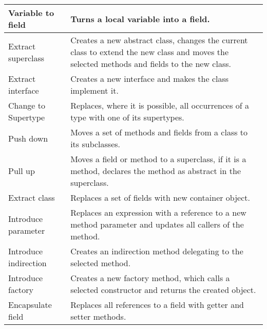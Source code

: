 \begin{table}[htbp]
\begin{tabular}{ |p{2.95cm}| p{9.15cm}|}
Variable to field         & Turns a local variable into a field.                                                                                                                                       \\ \hline
Extract superclass        & Creates a new abstract class, changes the current class to extend the new class and moves the selected methods and fields to the new class.                               \\ \hline
Extract interface         & Creates a new interface and makes the class implement it.                                                                                                                 \\ \hline
Change to Supertype       & Replaces, where it is possible, all occurrences of a type with one of its supertypes.                                                                                     \\ \hline
Push down                 & Moves a set of methods and fields from a class to its subclasses.                                                                                                         \\ \hline
Pull up                   & Moves a field or method to a superclass, if it is a method, declares the method as abstract in the superclass.                                                            \\ \hline
Extract class             & Replaces a set of fields with new container object.                                                                                                                       \\ \hline
Introduce parameter       & Replaces an expression with a reference to a new method parameter and updates all callers of the method.                                                                  \\ \hline
Introduce indirection     & Creates an indirection method delegating to the selected method.                                                                                                          \\ \hline
Introduce factory         & Creates a new factory method, which calls a selected constructor and returns the created object.                                                                          \\ \hline
Encapsulate field         & Replaces all references to a field with getter and setter methods.                                                                                                        \\ \hline

\end{tabular}
\end{table}
